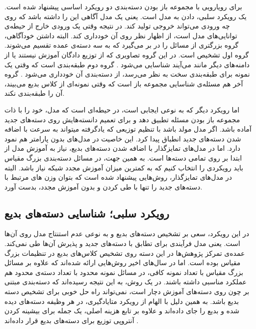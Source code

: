 برای رویارویی با مجموعه باز بودن دسته‌بندی دو رویکرد اساسی پیشنهاد شده است. یک رویکرد سلبی، دادن
 به مدل است. یعنی یک مدل آگاهی این را داشته باشد که روی چه ورودی می‌تواند خروجی تولید کند. در نتیجه وقتی یک ورودی خارج از
حیطه‌ی توانایی‌های مدل است، از اظهار نظر روی آن خودداری کند. البته داشتن خودآگاهی، گروه بزرگتری از مسائل را در بر می‌گیرد که به سه دسته‌ی عمده تقسیم می‌شوند. گروه اول تشخیص 
است. در این گروه تصاویری که از توزیع دادگان آموزش نیستند یا از دامنه‌های دیگر مانند
 می‌آیند شناسایی می‌شود
 \cite{Hendrycks2016ABF,Huang2017AdversarialAO}
 .
 گروه دوم طبقه‌بندی
  است که وقتی یک نمونه برای طبقه‌بندی سخت به نظر می‌رسد، از دسته‌بندی آن خودداری می‌شود
  \cite{Lu2017SafetyNetDA}
  .
  گروه آخر هم مسئله‌ی شناسایی مجموعه باز است که وقتی نمونه‌ای از کلاس بدیع می‌بیند، آن را طبقه‌بندی نکند.
  

اما رویکرد دیگر که به نوعی ایجابی است، در حیطه‌ای است که
مدل، خود را با ذات مجموعه باز بودن مسئله تطبیق دهد و برای تعمیم دانسته‌هایش روی دسته‌های جدید آماده باشد. اگر مدل مولد باشد با تنظیم توزیعی که یادگرفته میتواند به سرعت با اضافه شدن دسته‌های جدید انطباق پیدا کرد. این خاصیت در مدل‌های بدون پارامتر هم نمود دارد. اما در مدل‌های تمایزگذار با اضافه شدن دسته‌های بدیع، نیاز به آموزش مدل از ابتدا بر روی تمامی دسته‌ها است. به همین جهت، در مسائل دسته‌بندی بزرگ مقیاس باید رویکردی را انتخاب کنیم که به کمترین میزان آموزش مجدد شبکه نیاز باشد. البته در مدل‌های تمایزگذار، روش‌هایی پیشنهاد شده است که بتوان وزن های مرتبط با دسته‌های جدید را تنها با طی کردن 
و بدون آموزش مجدد، بدست آورد.

\subsection{رویکرد سلبی؛ شناسایی دسته‌های بدیع}

در این رویکرد، سعی بر تشخیص دسته‌های بدیع و به نوعی عدم استنتاج مدل روی آن‌ها است. یعنی مدل فرآیندی برای تطابق با دسته‌های جدید و پذیرش آن‌ها طی نمی‌کند. عمده‌ی تمرکز پژوهش‌ها در این دسته روی تشخیص کلاس‌های بدیع در تنظیمات بزرگ مقیاس بوده است. اما در سال‌های اخیر روش‌هایی ارائه شده‌اند که علاوه بر مسائل بزرگ مقیاس با تعداد نمونه کافی، در مسائل نمونه محدود با تعداد دسته‌ی محدود هم عملکرد مناسبی داشته باشند.
در یک روش، به این نتیجه رسیده‌اند که دسته‌بندی مبتنی بر 
چون روی دسته‌های آموزش دچار 
است، نمی‌تواند راه حل خوبی برای تشخیص دسته بدیع باشد. به همین دلیل با الهام از رویکرد متایادگیری، در هر وظیفه دسته‌های دیده شده و بدیع را جای داده‌‌اند و علاوه بر تابع هزینه اصلی، یک جمله برای بیشینه کردن آنتروپی توزیع 
برای دسته‌های بدیع قرار داده‌اند
\cite{Liu2020FewShotOR}
.

